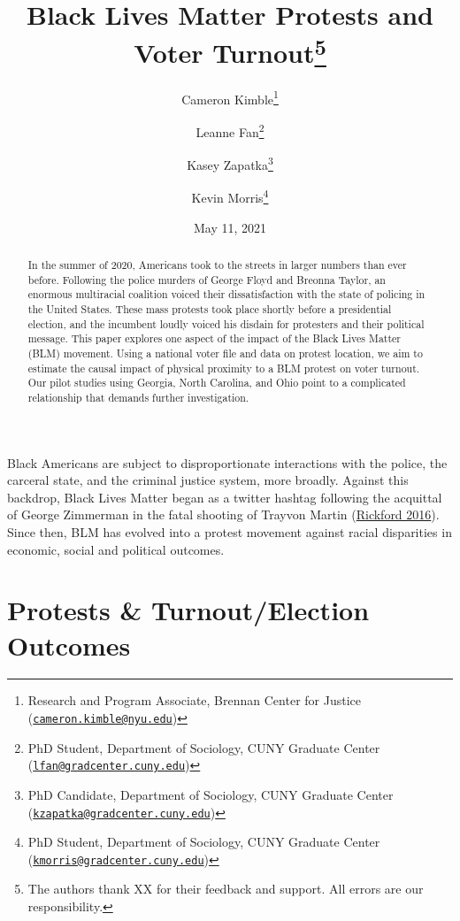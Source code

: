 \documentclass[
  12pt,
]{article}
\title{Black Lives Matter Protests and Voter Turnout\thanks{The authors thank XX for their feedback and support. All errors are our responsibility.}}
\author{Cameron Kimble\footnote{Research and Program Associate, Brennan Center for Justice (\href{mailto:cameron.kimble@nyu.edu}{\nolinkurl{cameron.kimble@nyu.edu}})} \and Leanne Fan\footnote{PhD Student, Department of Sociology, CUNY Graduate Center (\href{mailto:lfan@gradcenter.cuny.edu}{\nolinkurl{lfan@gradcenter.cuny.edu}})} \and Kasey Zapatka\footnote{PhD Candidate, Department of Sociology, CUNY Graduate Center (\href{mailto:kzapatka@gradcenter.cuny.edu}{\nolinkurl{kzapatka@gradcenter.cuny.edu}})} \and Kevin Morris\footnote{PhD Student, Department of Sociology, CUNY Graduate Center (\href{mailto:kmorris@gradcenter.cuny.edu}{\nolinkurl{kmorris@gradcenter.cuny.edu}})}}
\date{May 11, 2021}
\begin{document}
\maketitle
\begin{abstract}
In the summer of 2020, Americans took to the streets in larger numbers than ever before. Following the police murders of George Floyd and Breonna Taylor, an enormous multiracial coalition voiced their dissatisfaction with the state of policing in the United States. These mass protests took place shortly before a presidential election, and the incumbent loudly voiced his disdain for protesters and their political message. This paper explores one aspect of the impact of the Black Lives Matter (BLM) movement. Using a national voter file and data on protest location, we aim to estimate the causal impact of physical proximity to a BLM protest on voter turnout. Our pilot studies using Georgia, North Carolina, and Ohio point to a complicated relationship that demands further investigation.
\end{abstract}

\pagebreak
\doublespacing


Black Americans are subject to disproportionate interactions with the police, the carceral state, and the criminal justice system, more broadly. Against this backdrop, Black Lives Matter began as a twitter hashtag following the acquittal of George Zimmerman in the fatal shooting of Trayvon Martin (\protect\hyperlink{ref-Rickford2016}{Rickford 2016}). Since then, BLM has evolved into a protest movement against racial disparities in economic, social and political outcomes.

\hypertarget{protests-turnoutelection-outcomes}{%
\section*{Protests \& Turnout/Election Outcomes}\label{protests-turnoutelection-outcomes}}
\end{document}
